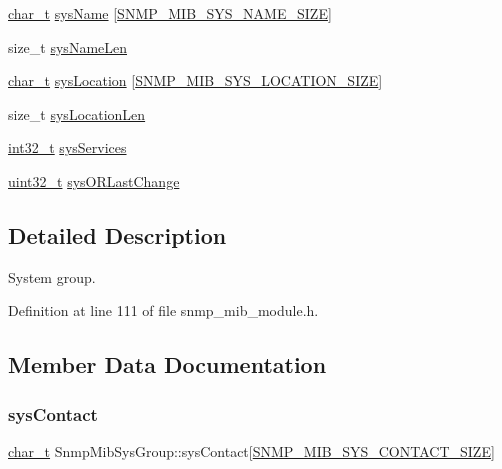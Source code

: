 \begin{DoxyCompactItemize}
\item 
\hyperlink{compiler__port_8h_a40bb5262bf908c328fbcfbe5d29d0201}{char\+\_\+t} \hyperlink{structSnmpMibSysGroup_a83c68905155bdda8e434f6888187c023}{sys\+Name} \mbox{[}\hyperlink{snmp__mib__module_8h_af0f58fc12e89fc76f8563540ddbcc82f}{S\+N\+M\+P\+\_\+\+M\+I\+B\+\_\+\+S\+Y\+S\+\_\+\+N\+A\+M\+E\+\_\+\+S\+I\+ZE}\mbox{]}
\item 
size\+\_\+t \hyperlink{structSnmpMibSysGroup_a339bcb89df356dbdd43bc43cbc94d25d}{sys\+Name\+Len}
\item 
\hyperlink{compiler__port_8h_a40bb5262bf908c328fbcfbe5d29d0201}{char\+\_\+t} \hyperlink{structSnmpMibSysGroup_a5ee7cc159ea0df795ef7f811fae649da}{sys\+Location} \mbox{[}\hyperlink{snmp__mib__module_8h_aaa419f0c2229fff5f62e5cbbaa59e48c}{S\+N\+M\+P\+\_\+\+M\+I\+B\+\_\+\+S\+Y\+S\+\_\+\+L\+O\+C\+A\+T\+I\+O\+N\+\_\+\+S\+I\+ZE}\mbox{]}
\item 
size\+\_\+t \hyperlink{structSnmpMibSysGroup_a4e627c50ec2d8b12defc2e50666765af}{sys\+Location\+Len}
\item 
\hyperlink{stdint_8h_ab1967d8591af1a4e48c37fd2b0f184d0}{int32\+\_\+t} \hyperlink{structSnmpMibSysGroup_a163e0fdf384e7ded63f636235c8166ee}{sys\+Services}
\item 
\hyperlink{stdint_8h_a435d1572bf3f880d55459d9805097f62}{uint32\+\_\+t} \hyperlink{structSnmpMibSysGroup_abbd4d54898ea9e75c4223ebdfa02799c}{sys\+O\+R\+Last\+Change}
\end{DoxyCompactItemize}


\subsection{Detailed Description}
System group. 

Definition at line 111 of file snmp\+\_\+mib\+\_\+module.\+h.



\subsection{Member Data Documentation}
\mbox{\label{structSnmpMibSysGroup_a343ab7098661b03252065d004a2005bd}} 
\subsubsection{\texorpdfstring{sys\+Contact}{sysContact}}
{\footnotesize\ttfamily \hyperlink{compiler__port_8h_a40bb5262bf908c328fbcfbe5d29d0201}{char\+\_\+t} Snmp\+Mib\+Sys\+Group\+::sys\+Contact\mbox{[}\hyperlink{snmp__mib__module_8h_ae4f3bcd222e59a69d4289a8d7c353714}{S\+N\+M\+P\+\_\+\+M\+I\+B\+\_\+\+S\+Y\+S\+\_\+\+C\+O\+N\+T\+A\+C\+T\+\_\+\+S\+I\+ZE}\mbox{]}}



